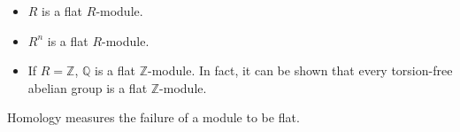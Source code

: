 \begin{itemize}
	\item $R$ is a flat $R$-module.
	\item $R^n$ is a flat $R$-module.
	\item If $R=\mathbb{Z}$, $\mathbb{Q}$ is a flat $\mathbb{Z}$-module. In fact,
		it can be shown that every torsion-free abelian group is a flat
		$\mathbb{Z}$-module.
\end{itemize}
Homology measures the failure of a module to be flat.

